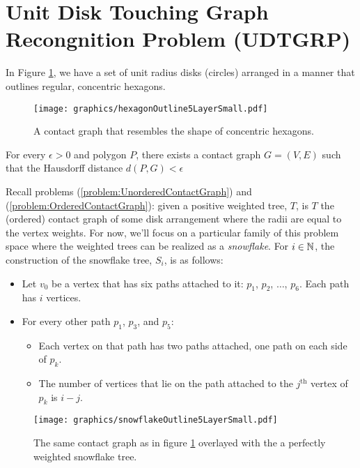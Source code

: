 \section{Unit Disk Touching Graph Recongnition Problem (UDTGRP)}

In Figure \ref{fig:hexagonOutline5LayerSmall.pdf}, we have a set of unit radius disks (circles) arranged in a manner that outlines regular, concentric hexagons.
\begin{figure}[!htbp]
\begin{center}
\texttt{[image: graphics/hexagonOutline5LayerSmall.pdf]}
\caption{A contact graph that resembles the shape of concentric hexagons.}\label{fig:hexagonOutline5LayerSmall.pdf}
\end{center}
\end{figure}
\begin{prob}\label{problem:ApproxShapesWithContactGraphs}
For every $\epsilon >0$ and polygon $P$, there exists a contact graph $G = (V,E)$  such that the Hausdorff distance $d(P,G) < \epsilon$
\end{prob}

Recall problems (\ref{problem:UnorderedContactGraph}) and (\ref{problem:OrderedContactGraph}): given a positive weighted tree, $T$, is $T$ the (ordered) contact graph of some disk arrangement where the radii are equal to the vertex weights.  For now, we'll focus on a particular family of this problem space where the weighted trees can be realized as a \textit{snowflake}. For $i \in {\mathbb{N}}$, the construction of the snowflake tree, $S_i$, is as follows:
\begin{itemize}
\item Let $v_0$ be a vertex that has six paths attached to it: $p_1$, $p_2$, $\dots$, $p_6$.  Each path has $i$ vertices.
\item For every other path $p_1$, $p_3$, and $p_5$: 
	\begin{itemize}
		\item 	Each vertex on that path has two paths attached, one path on each side of $p_k$.
		\item	The number of vertices that lie on the path attached to the $j^\text{th}$ vertex of $p_k$ is $i-j$.
	\end{itemize}
\end{itemize}
\begin{figure}[!htbp]
\begin{center}
\texttt{[image: graphics/snowflakeOutline5LayerSmall.pdf]}
\caption{The same contact graph as in figure \ref{fig:hexagonOutline5LayerSmall.pdf} overlayed with the a perfectly weighted snowflake tree.}\label{fig:snowflakeOutline5LayerSmall.pdf}
\end{center}
\end{figure}

